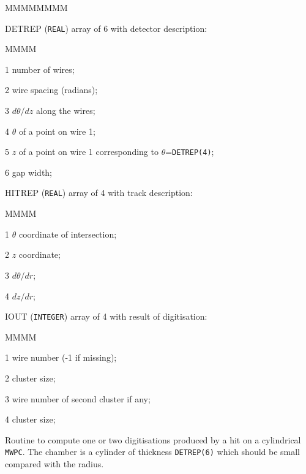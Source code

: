 \begin{DLtt}{MMMMMMMM}
\item[DETREP] ({\tt REAL}) array of 6 with detector description:
\begin{DLtt}{MMMM}
\item[1] number of wires;
\item[2] wire spacing (radians);
\item[3] $d\theta/dz$ along the wires;
\item[4] $\theta$ of a point on wire 1;
\item[5] $z$ of a point on wire 1 corresponding to $\theta$={\tt DETREP(4)};
\item[6] gap width;
\end{DLtt}
\item[HITREP] ({\tt REAL}) array of 4 with track description:
\begin{DLtt}{MMMM}
\item[1] $\theta$ coordinate of intersection;
\item[2] $z$ coordinate;
\item[3] $d\theta/dr$;
\item[4] $dz/dr$;
\end{DLtt}
\item[IOUT] ({\tt INTEGER}) array of 4 with result of digitisation:
\begin{DLtt}{MMMM}
\item[1] wire number (-1 if missing);
\item[2] cluster size;
\item[3] wire number of second cluster if any;
\item[4] cluster size;
\end{DLtt}
\end{DLtt}
Routine to compute one or two digitisations produced
by a hit on a cylindrical {\tt MWPC}. The chamber is a cylinder of thickness
{\tt DETREP(6)} which should be small compared with the radius.

